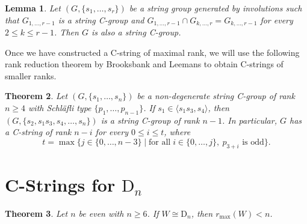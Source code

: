 \documentclass{amsart}
\numberwithin{equation}{section}
\theoremstyle{plain} %
\newtheorem{theorem}{Theorem}[section]
\newtheorem{lemma}[theorem]{Lemma}
\begin{document}
\begin{lemma}{\cite[2E16(b)]{arpbible}} \label{ip2}
Let $(G,\{ s_1,\dots,s_r \})$ be a string group generated by involutions such that $G_{1,\dots,r-1}$ is a string C-group and $G_{1,\dots,r-1} \cap G_{k,\dots,r} = G_{k,\dots,r-1}$ for every $2 \leq k \leq r-1$. Then $G$ is also a string C-group.
\end{lemma}


Once we have constructed a C-string of maximal rank, we will use the following rank reduction theorem by Brooksbank and Leemans to obtain C-strings of smaller ranks. 

\begin{theorem}{\cite[Theorem 1.1 and Corollary 1.3]{rankred}} \label{rankred}
Let $(G,\{ s_1,\dots,s_n \})$ be a non-degenerate string C-group of rank $n \ge 4$ with Schl\"{a}fli type $\{p_1,\dots,p_{n-1}\}$. If $s_1 \in \langle s_1 s_3 , s_4 \rangle$, then $(G,\{ s_2, s_1 s_3, s_4, \dots,  s_n \})$ is a string C-group of rank $n-1$. In particular, $G$ has a C-string of rank $n-i$ for every $0 \leq i \leq t$, where
\begin{equation*}
t = \max \{ j \in \{0,\dots,n-3\} \mid \text{for all} \;  i \in \{0,\dots,j\}, \ p_{3+i} \text{ is odd} \}.
\end{equation*}
\end{theorem}

\section{C-Strings for $\mathrm{D}_n$} \label{maxrank} 

\begin{theorem}\label{Dnneven}
Let $n$ be even with $n \geq 6$. If $W \cong \mathrm{D}_n$, then $r_{\mathrm{max}}(W) < n$.
\end{theorem}
\end{document}
